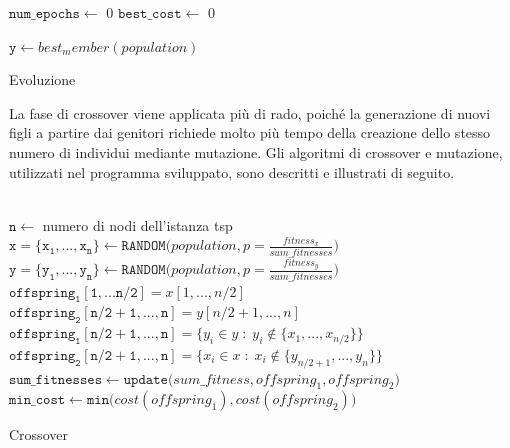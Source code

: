 \begin{algorithm}[h]
\DontPrintSemicolon
{}
\BlankLine
 $\mathtt{num\_epochs} \gets$ 0\;
 $\mathtt{best\_cost} \gets$ 0\;
 \BlankLine
 
 $\mathtt{y}\gets best_member(population)$
 \caption{Evoluzione}
\end{algorithm}
La fase di crossover viene applicata più di rado, poiché la generazione di nuovi figli a partire dai genitori richiede molto più tempo della creazione dello stesso numero di individui mediante mutazione. Gli algoritmi di crossover e mutazione, utilizzati nel programma sviluppato, sono descritti e illustrati di seguito.\\\\
\begin{algorithm}[h]
\DontPrintSemicolon
{}
\BlankLine 
$\mathtt{n}\gets$ numero di nodi dell'istanza tsp\;
$\mathtt{x=\{x_1,...,x_n\} \gets RANDOM(}population, p=\frac{fitness_x}{sum\_fitnesses})$\;
$\mathtt{y=\{y_1,...,y_n\} \gets RANDOM(}population, p=\frac{fitness_y}{sum\_fitnesses})$\;
 \BlankLine \BlankLine
 $\mathtt{offspring_1[1,...n/2]}=x[1,..., n/2]$\;
 $\mathtt{offspring_2[n/2+1,...,n]}=y[n/2+1,..., n]$\;
 $\mathtt{offspring_1[n/2+1,...,n]}=\{y_i\in y\; :\; y_i\not\in\{x_1, ..., x_{n/2}\}\}$\;
 $\mathtt{offspring_2[n/2+1,...,n]}=\{x_i\in x\; :\; x_i\not\in\{y_{n/2+1}, ..., y_{n}\}\}$\;
  \BlankLine
  $\mathtt{sum\_fitnesses\gets update(}sum\_fitness, offspring_1, offspring_2\mathtt{)}$\;
  \BlankLine  
  $\mathtt{min\_cost \gets min(}cost(offspring_1), cost(offspring_2)\mathtt{)}$\;  
  \BlankLine
\caption{Crossover}\label{crossover_pseudo}
\end{algorithm}

